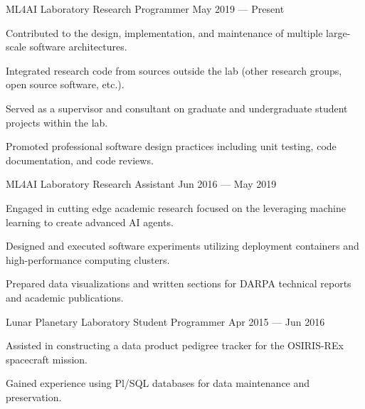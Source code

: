 
\vspace{-0.2cm}
\begin{cventries}

  \cventry
    {ML4AI Laboratory} %
    {Research Programmer} %
    {May 2019 --- Present} %
    {} %
    {
      \begin{cvitems} %
        \item Contributed to the design, implementation, and maintenance of multiple large-scale software architectures.
        \item Integrated research code from sources outside the lab (other research groups, open source software, etc.).
        \item Served as a supervisor and consultant on graduate and undergraduate student projects within the lab.
        \item Promoted professional software design practices including unit testing, code documentation, and code reviews.
      \end{cvitems}
    }

  \cventry
    {ML4AI Laboratory} %
    {Research Assistant} %
    {Jun 2016 --- May 2019} %
    {} %
    {
      \begin{cvitems} %
        \item Engaged in cutting edge academic research focused on the leveraging machine learning to create advanced AI agents.
        \item Designed and executed software experiments utilizing deployment containers and high-performance computing clusters.
        \item Prepared data visualizations and written sections for DARPA technical reports and academic publications.
      \end{cvitems}
    }

  \cventry
    {Lunar Planetary Laboratory} %
    {Student Programmer} %
    {Apr 2015 --- Jun 2016} %
    {} %
    {
      \begin{cvitems} %
        \item Assisted in constructing a data product pedigree tracker for the OSIRIS-REx spacecraft mission.
        \item Gained experience using Pl/SQL databases for data maintenance and preservation.
      \end{cvitems}
    }

\end{cventries}

